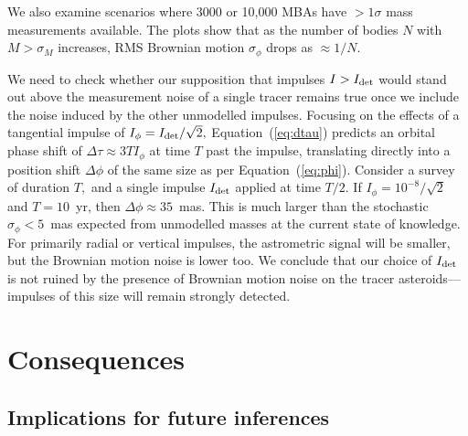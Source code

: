 \documentclass[linenumbers, onecolumn]{aastex631}
\newcommand{\eqq}[1]{Equation~(\ref{#1})}
\newcommand\edited[1]{{\color{red} {#1}}}
\begin{document}
\edited{We also examine scenarios where 3000 or 10,000 MBAs have $>1\sigma$ mass
  measurements available.  The plots show that as the number of bodies $N$ with
  $M>\sigma_M$ increases, RMS Brownian motion $\sigma_\phi$ drops as $\approx1/N.$}
  

We need to check whether our supposition that impulses $I>I_{\rm det}$
would stand out above the measurement noise of a single tracer remains
true once we include the noise induced by the other unmodelled
impulses.  Focusing on the effects of a tangential impulse of
$I_\phi=I_{\rm det}/\sqrt{2},$ \eqq{eq:dtau} predicts an orbital phase
shift of $\Delta\tau \approx 3TI_\phi$ at time $T$ past the impulse,
translating directly into a position shift $\Delta\phi$ of the same
size as per \eqq{eq:phi}.  Consider a survey of duration $T,$ and a
single impulse $I_{\rm det}$ applied at time $T/2.$ If
$I_\phi=10^{-8}/\sqrt{2}$ and $T=10$~yr, then
$\Delta\phi\approx35$~mas.  This is much larger than the
stochastic \edited{$\sigma_\phi < 5$~mas} expected from unmodelled masses at the
current state of knowledge.  For primarily radial or vertical
impulses, the astrometric signal will be smaller, but the Brownian
motion noise is lower too. 
We conclude that our choice of $I_{\rm
det}$ is not ruined by the presence of Brownian motion noise on the
tracer asteroids---impulses of this size will remain strongly detected.

\section{Consequences}
\label{sec:discuss}
\subsection{Implications for future inferences}
  
\end{document}
